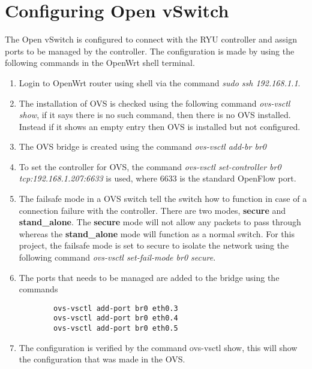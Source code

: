 \section{Configuring Open vSwitch}
The Open vSwitch is configured to connect with the RYU controller and assign ports to be managed by the controller. The configuration is made by using the following commands in the OpenWrt shell terminal.
\begin{enumerate}
	\item Login to OpenWrt router using shell via the command \textit{sudo ssh 192.168.1.1}.
	\item The installation of OVS is checked using the following command \textit{ovs-vsctl show}, if it says there is no such command, then there is no OVS installed. Instead if it shows an empty entry then OVS is installed but not configured.
	\item The OVS bridge is created using the command \textit{ovs-vsctl add-br br0}
	\item To set the controller for OVS, the command \textit{ovs-vsctl set-controller br0 tcp:192.168.1.207:6633} is used, where 6633 is the standard OpenFlow port.
	\item The failsafe mode in a OVS switch tell the switch how to function in case of a connection failure with the controller. There are two modes, \textbf{secure} and \textbf{stand\_alone}. The \textbf{secure} mode will not allow any packets to pass through whereas the \textbf{stand\_alone} mode will function as a normal switch. For this project, the failsafe mode is set to secure to isolate the network using the following command \textit{ovs-vsctl set-fail-mode br0 secure}.
	\item The ports that needs to be managed are added to the bridge using the commands
	\begin{lstlisting}
		ovs-vsctl add-port br0 eth0.3
		ovs-vsctl add-port br0 eth0.4
		ovs-vsctl add-port br0 eth0.5
	\end{lstlisting}
	\item The configuration is verified by the command ovs-vsctl show, this will show the configuration that was made in the OVS.
	
\end{enumerate}
